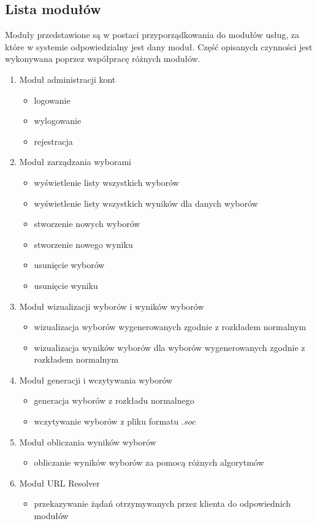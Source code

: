 \documentclass[polish,11pt]{aghthesis}
\begin{document}
\subsection{Lista modułów}
Moduły przedstawione są w postaci przyporządkowania do modułów usług, za które w
systemie odpowiedzialny jest dany moduł. Część opisanych czynności jest wykonywana
poprzez współpracę różnych modułów.

\noindent
\begin{enumerate}[leftmargin=0.5cm]
\item Moduł administracji kont
	\begin{itemize}
	\item logowanie
	\item wylogowanie
	\item rejestracja
	\end{itemize}
\item Moduł zarządzania wyborami
	\begin{itemize}
	\item wyświetlenie listy wszystkich wyborów
	\item wyświetlenie listy wszystkich wyników dla danych wyborów
	\item stworzenie nowych wyborów
	\item stworzenie nowego wyniku
	\item usunięcie wyborów
	\item usunięcie wyniku
	\end{itemize}
\item Moduł wizualizacji wyborów i wyników wyborów
	\begin{itemize}
	\item wizualizacja wyborów wygenerowanych zgodnie z rozkładem normalnym
	\item wizualizacja wyników wyborów dla wyborów wygenerowanych zgodnie z rozkładem
normalnym
	\end{itemize}
\item Moduł generacji i wczytywania wyborów
	\begin{itemize}
	\item generacja wyborów z rozkładu normalnego
	\item wczytywanie wyborów z pliku formatu $.soc$
	\end{itemize}
\item Moduł obliczania wyników wyborów
	\begin{itemize}
	\item obliczanie wyników wyborów za pomocą różnych algorytmów
	\end{itemize}
\item Moduł URL Resolver
	\begin{itemize}
	\item przekazywanie żądań otrzymywanych przez klienta do odpowiednich modułów
	\end{itemize}
\end{enumerate}
\end{document}

